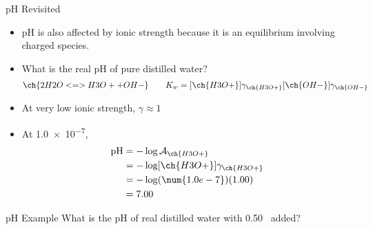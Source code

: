 \documentclass[notes=onlyslideswithnotes,notes=hide]{beamer}
\begin{document}
\begin{frame}{pH Revisited}
	\begin{itemize}
		\item pH is also affected by ionic strength because it is an
			equilibrium involving charged species.
		\item What is the real pH of pure distilled water?
			\begin{align*}
				\ch{2 H2O <=> H3O+ + OH-} \qquad K_w =
				[\ch{H3O+}]\gamma_{\ch{H3O+}}
				[\ch{OH-}]\gamma_{\ch{OH-}}
			\end{align*}
		\item At very low ionic strength, $\gamma \approx 1$
		\item At \SI{1.0e-7}{\Molar},
			\begin{align*}
				\text{pH} &= -\log \mathcal{A}_{\ch{H3O+}} \\
				&= -\log [\ch{H3O+}]\gamma_{\ch{H3O+}}
				\\
				&= -\log (\num{1.0e-7})(1.00) \\
				&= 7.00
			\end{align*}
	\end{itemize}
\end{frame}

\begin{frame}[t]{pH Example}
	What is the pH of real distilled water with \SI{0.50}{\Molar}~
	added?


\end{frame}

\end{document}
